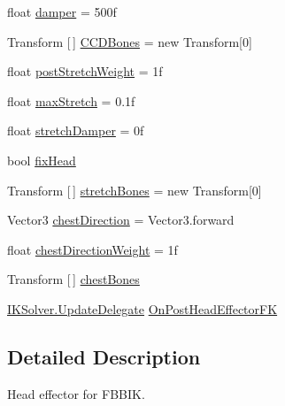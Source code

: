 \begin{DoxyCompactItemize}
\item 
float \mbox{\hyperlink{class_root_motion_1_1_final_i_k_1_1_f_b_b_i_k_head_effector_a273f803012f4c54cf5a421fb8f304f7e}{damper}} = 500f
\item 
Transform \mbox{[}$\,$\mbox{]} \mbox{\hyperlink{class_root_motion_1_1_final_i_k_1_1_f_b_b_i_k_head_effector_aee33dac1727bb99933e2e3900353d0ba}{C\+C\+D\+Bones}} = new Transform\mbox{[}0\mbox{]}
\item 
float \mbox{\hyperlink{class_root_motion_1_1_final_i_k_1_1_f_b_b_i_k_head_effector_aaebc03dfe32ed3e813a7e0901ab70aff}{post\+Stretch\+Weight}} = 1f
\item 
float \mbox{\hyperlink{class_root_motion_1_1_final_i_k_1_1_f_b_b_i_k_head_effector_a67f5c51ca3cf5b4e558a9322c11a7e33}{max\+Stretch}} = 0.\+1f
\item 
float \mbox{\hyperlink{class_root_motion_1_1_final_i_k_1_1_f_b_b_i_k_head_effector_a048ab15b5256bef7979ed26173e4da99}{stretch\+Damper}} = 0f
\item 
bool \mbox{\hyperlink{class_root_motion_1_1_final_i_k_1_1_f_b_b_i_k_head_effector_ad21cafb3e8e65a151a684d140b15b3b3}{fix\+Head}}
\item 
Transform \mbox{[}$\,$\mbox{]} \mbox{\hyperlink{class_root_motion_1_1_final_i_k_1_1_f_b_b_i_k_head_effector_a39f1ee2b7071843e6158ae3a70dcd044}{stretch\+Bones}} = new Transform\mbox{[}0\mbox{]}
\item 
Vector3 \mbox{\hyperlink{class_root_motion_1_1_final_i_k_1_1_f_b_b_i_k_head_effector_a5354e354e5a5f9fb110671daa9d0b212}{chest\+Direction}} = Vector3.\+forward
\item 
float \mbox{\hyperlink{class_root_motion_1_1_final_i_k_1_1_f_b_b_i_k_head_effector_ad65788fa72ebe641efa980ee6ae7706b}{chest\+Direction\+Weight}} = 1f
\item 
Transform \mbox{[}$\,$\mbox{]} \mbox{\hyperlink{class_root_motion_1_1_final_i_k_1_1_f_b_b_i_k_head_effector_a67950e36f9fe985c7c257147d57a737b}{chest\+Bones}}
\item 
\mbox{\hyperlink{class_root_motion_1_1_final_i_k_1_1_i_k_solver_a237d83c7b9c6eace8a21aa5821f0a671}{I\+K\+Solver.\+Update\+Delegate}} \mbox{\hyperlink{class_root_motion_1_1_final_i_k_1_1_f_b_b_i_k_head_effector_a00a130dbf0770dc8d520031559af59c7}{On\+Post\+Head\+Effector\+FK}}
\end{DoxyCompactItemize}


\subsection{Detailed Description}
Head effector for F\+B\+B\+IK. 



